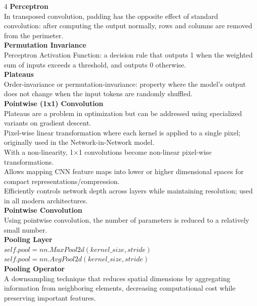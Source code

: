 \documentclass[8pt]{extarticle}
\begin{document}
\begin{multicols}{4}
\vspace{2pt}\textbf{Perceptron}\\
In transposed convolution, padding has the opposite effect of standard convolution: after computing the output normally, rows and columns are removed from the perimeter.\\
\vspace{2pt}\textbf{Permutation Invariance}\\
Perceptron Activation Function: a decision rule that outputs 1 when the weighted sum of inputs exceeds a threshold, and outputs 0 otherwise.\\
\vspace{2pt}\textbf{Plateaus}\\
Order‑invariance or permutation‑invariance: property where the model's output does not change when the input tokens are randomly shuffled.\\
\vspace{2pt}\textbf{Pointwise (1x1) Convolution}\\
Plateaus are a problem in optimization but can be addressed using specialized variants on gradient descent.\\
Pixel-wise linear transformation where each kernel is applied to a single pixel; originally used in the Network-in-Network model.\\
With a non-linearity, 1×1 convolutions become non-linear pixel-wise transformations.\\
Allows mapping CNN feature maps into lower or higher dimensional spaces for compact representations/compression.\\
Efficiently controls network depth across layers while maintaining resolution; used in all modern architectures.\\
\vspace{2pt}\textbf{Pointwise Convolution}\\
Using pointwise convolution, the number of parameters is reduced to a relatively small number.\\
\vspace{2pt}\textbf{Pooling Layer}\\
$self.pool = nn.MaxPool2d(kernel\_{}size, stride)$\\
$self.pool = nn.AvgPool2d(kernel\_{}size, stride)$\\
\vspace{2pt}\textbf{Pooling Operator}\\
A downsampling technique that reduces spatial dimensions by aggregating information from neighboring elements, decreasing computational cost while preserving important features.\\

\end{multicols}
\end{document}
